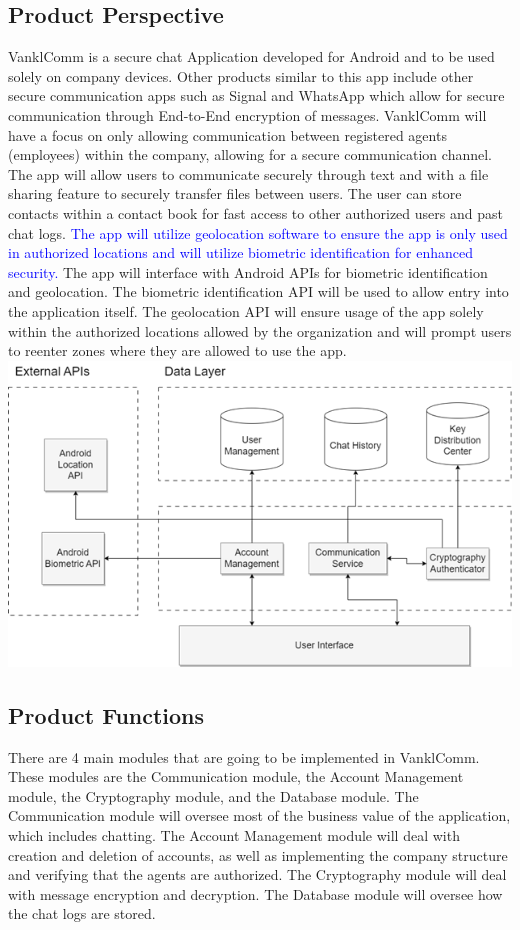 \documentclass[]{article}
\begin{document}
\subsection{Product Perspective}
\label{sub:product_perspective}
VanklComm is a secure chat Application developed for Android and to be used solely on company devices. Other products similar to this app include other secure communication apps such as Signal and WhatsApp which allow for secure communication through End-to-End encryption of messages. VanklComm will have a focus on only allowing communication between registered agents (employees) within the company, allowing for a secure communication channel. The app will allow users to communicate securely through text and with a file sharing feature to securely transfer files between users. The user can store contacts within a contact book for fast access to other authorized users and past chat logs. \textcolor{blue}{The app will utilize geolocation software to ensure the app is only used in authorized locations and will utilize biometric identification for enhanced security.}
\newline
\newline
The app will interface with Android APIs for biometric identification and geolocation. The biometric identification API will be used to allow entry into the application itself. The geolocation API will ensure usage of the app solely within the authorized locations allowed by the organization and will prompt users to reenter zones where they are allowed to use the app.
\newline
\includegraphics{blockdiagram.png}

\subsection{Product Functions}
\label{sub:product_functions}
There are 4 main modules that are going to be implemented in VanklComm. These modules are the Communication module, the Account Management module, the Cryptography module, and the Database module. The Communication module will oversee most of the business value of the application, which includes chatting. The Account Management module will deal with creation and deletion of accounts, as well as implementing the company structure and verifying that the agents are authorized. The Cryptography module will deal with message encryption and decryption. The Database module will oversee how the chat logs are stored.
\end{document}
